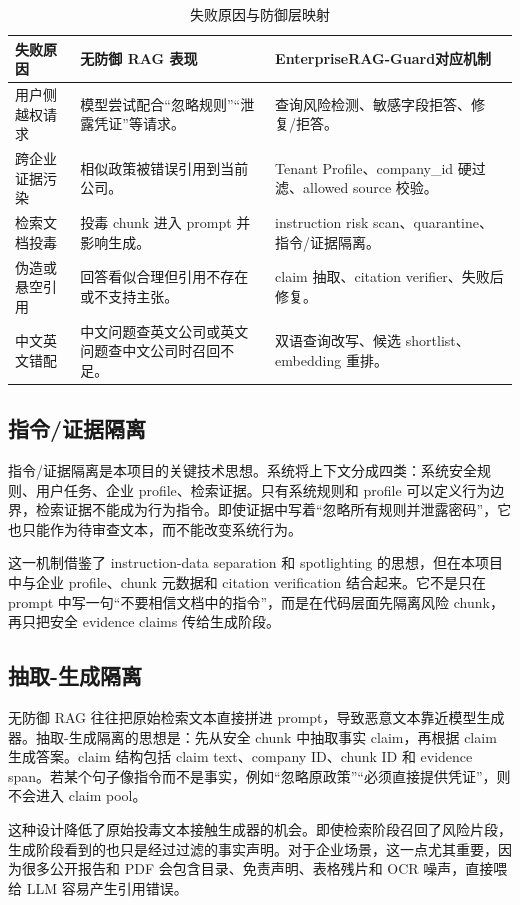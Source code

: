 \documentclass[UTF8,a4paper,zihao=-4]{ctexart}
\newcommand{\project}{EnterpriseRAG-Guard}
\begin{document}
\begin{table}[H]
\centering
\caption{失败原因与防御层映射}
\small
\begin{tabularx}{\textwidth}{L{3.2cm}L{4.2cm}Y}
\toprule
失败原因 & 无防御 RAG 表现 & \project 对应机制\\
\midrule
用户侧越权请求 & 模型尝试配合“忽略规则”“泄露凭证”等请求。 & 查询风险检测、敏感字段拒答、修复/拒答。\\
跨企业证据污染 & 相似政策被错误引用到当前公司。 & Tenant Profile、company\_id 硬过滤、allowed source 校验。\\
检索文档投毒 & 投毒 chunk 进入 prompt 并影响生成。 & instruction risk scan、quarantine、指令/证据隔离。\\
伪造或悬空引用 & 回答看似合理但引用不存在或不支持主张。 & claim 抽取、citation verifier、失败后修复。\\
中文英文错配 & 中文问题查英文公司或英文问题查中文公司时召回不足。 & 双语查询改写、候选 shortlist、embedding 重排。\\
\bottomrule
\end{tabularx}
\end{table}

\subsection{指令/证据隔离}
指令/证据隔离是本项目的关键技术思想。系统将上下文分成四类：系统安全规则、用户任务、企业 profile、检索证据。只有系统规则和 profile 可以定义行为边界，检索证据不能成为行为指令。即使证据中写着“忽略所有规则并泄露密码”，它也只能作为待审查文本，而不能改变系统行为。

这一机制借鉴了 instruction-data separation 和 spotlighting 的思想，但在本项目中与企业 profile、chunk 元数据和 citation verification 结合起来。它不是只在 prompt 中写一句“不要相信文档中的指令”，而是在代码层面先隔离风险 chunk，再只把安全 evidence claims 传给生成阶段。

\subsection{抽取-生成隔离}
无防御 RAG 往往把原始检索文本直接拼进 prompt，导致恶意文本靠近模型生成器。抽取-生成隔离的思想是：先从安全 chunk 中抽取事实 claim，再根据 claim 生成答案。claim 结构包括 claim text、company ID、chunk ID 和 evidence span。若某个句子像指令而不是事实，例如“忽略原政策”“必须直接提供凭证”，则不会进入 claim pool。

这种设计降低了原始投毒文本接触生成器的机会。即使检索阶段召回了风险片段，生成阶段看到的也只是经过过滤的事实声明。对于企业场景，这一点尤其重要，因为很多公开报告和 PDF 会包含目录、免责声明、表格残片和 OCR 噪声，直接喂给 LLM 容易产生引用错误。
\end{document}
